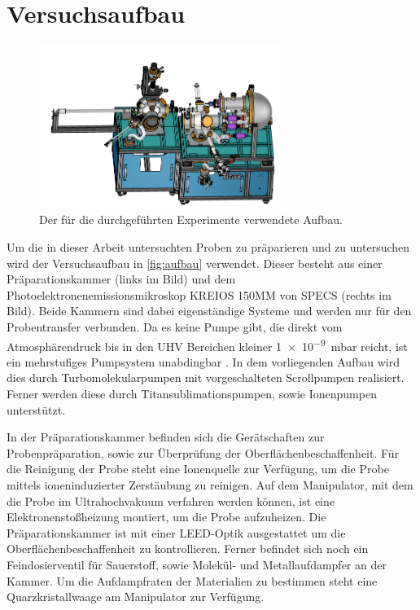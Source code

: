     \section{Versuchsaufbau}
    \label{sec:Versuchsaufbau}
        \begin{figure}
            \centering
            \includegraphics[width=0.7\textwidth]{MM.png}
            \caption{Der für die durchgeführten Experimente verwendete Aufbau.}
            \label{fig:aufbau}
        \end{figure}
        Um die in dieser Arbeit untersuchten Proben zu präparieren und zu untersuchen wird der Versuchsaufbau in \autoref{fig:aufbau} verwendet.
        Dieser besteht aus einer Präparationskammer (links im Bild) und dem Photoelektronenemissionsmikroskop KREIOS 150MM von SPECS (rechts im Bild).
        Beide Kammern sind dabei eigenständige Systeme und werden nur für den Probentransfer verbunden.
        Da es keine Pumpe gibt, die direkt vom Atmosphärendruck bis in den UHV Bereichen kleiner \SI{1e-9}{\milli\bar} reicht, ist ein mehrstufiges Pumpsystem unabdingbar \cite{Henzler}.
        In dem vorliegenden Aufbau wird dies durch Turbomolekularpumpen mit vorgeschalteten Scrollpumpen realisiert.
        Ferner werden diese durch Titansublimationspumpen, sowie Ionenpumpen unterstützt.

        In der Präparationskammer befinden sich die Gerätschaften zur Probenpräparation, sowie zur Überprüfung der Oberflächenbeschaffenheit.
        Für die Reinigung der Probe steht eine Ionenquelle zur Verfügung, um die Probe mittels ioneninduzierter Zerstäubung zu reinigen.
        Auf dem Manipulator, mit dem die Probe im Ultrahochvakuum verfahren werden können, ist eine Elektronenstoßheizung montiert, um die Probe aufzuheizen.
        Die Präparationskammer ist mit einer LEED-Optik ausgestattet um die Oberflächenbeschaffenheit zu kontrollieren.
        Ferner befindet sich noch ein Feindosierventil für Sauerstoff, sowie Molekül- und Metallaufdampfer an der Kammer.
        Um die Aufdampfraten der Materialien zu bestimmen steht eine Quarzkristallwaage am Manipulator zur Verfügung.

